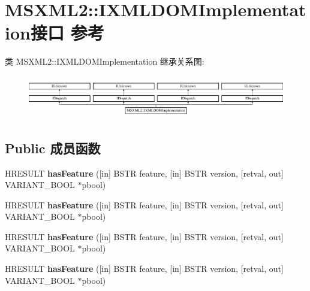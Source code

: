 \hypertarget{interface_m_s_x_m_l2_1_1_i_x_m_l_d_o_m_implementation}{}\section{M\+S\+X\+M\+L2\+:\+:I\+X\+M\+L\+D\+O\+M\+Implementation接口 参考}
\label{interface_m_s_x_m_l2_1_1_i_x_m_l_d_o_m_implementation}
类 M\+S\+X\+M\+L2\+:\+:I\+X\+M\+L\+D\+O\+M\+Implementation 继承关系图\+:\begin{figure}[H]
\begin{center}
\leavevmode
\includegraphics[height=1.900452cm]{interface_m_s_x_m_l2_1_1_i_x_m_l_d_o_m_implementation}
\end{center}
\end{figure}
\subsection*{Public 成员函数}
\begin{DoxyCompactItemize}
\item 
\mbox{\label{interface_m_s_x_m_l2_1_1_i_x_m_l_d_o_m_implementation_a899470c88613125b4a7a649e737626f5}} 
H\+R\+E\+S\+U\+LT {\bfseries has\+Feature} (\mbox{[}in\mbox{]} B\+S\+TR feature, \mbox{[}in\mbox{]} B\+S\+TR version, \mbox{[}retval, out\mbox{]} V\+A\+R\+I\+A\+N\+T\+\_\+\+B\+O\+OL $\ast$pbool)
\item 
\mbox{\label{interface_m_s_x_m_l2_1_1_i_x_m_l_d_o_m_implementation_a899470c88613125b4a7a649e737626f5}} 
H\+R\+E\+S\+U\+LT {\bfseries has\+Feature} (\mbox{[}in\mbox{]} B\+S\+TR feature, \mbox{[}in\mbox{]} B\+S\+TR version, \mbox{[}retval, out\mbox{]} V\+A\+R\+I\+A\+N\+T\+\_\+\+B\+O\+OL $\ast$pbool)
\item 
\mbox{\label{interface_m_s_x_m_l2_1_1_i_x_m_l_d_o_m_implementation_a899470c88613125b4a7a649e737626f5}} 
H\+R\+E\+S\+U\+LT {\bfseries has\+Feature} (\mbox{[}in\mbox{]} B\+S\+TR feature, \mbox{[}in\mbox{]} B\+S\+TR version, \mbox{[}retval, out\mbox{]} V\+A\+R\+I\+A\+N\+T\+\_\+\+B\+O\+OL $\ast$pbool)
\item 
\mbox{\label{interface_m_s_x_m_l2_1_1_i_x_m_l_d_o_m_implementation_a899470c88613125b4a7a649e737626f5}} 
H\+R\+E\+S\+U\+LT {\bfseries has\+Feature} (\mbox{[}in\mbox{]} B\+S\+TR feature, \mbox{[}in\mbox{]} B\+S\+TR version, \mbox{[}retval, out\mbox{]} V\+A\+R\+I\+A\+N\+T\+\_\+\+B\+O\+OL $\ast$pbool)
\end{DoxyCompactItemize}
